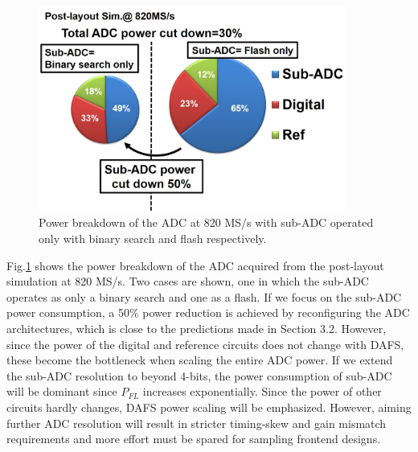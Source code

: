 \begin{figure}
\centering
  \includegraphics[width=0.9\textwidth]{figure/chap3/fig20.jpg}
  \caption{Power breakdown of the ADC at 820 MS/s with sub-ADC operated
only with binary search and flash respectively.}
  \label{fig-3-20}
\end{figure}

Fig.\ref{fig-3-20} shows the power breakdown of the ADC acquired from the post-layout simulation at 820 MS/s. Two cases are shown, one in which the sub-ADC operates as only a binary search and one as a flash. If we focus on the sub-ADC power consumption, a 50\% power reduction is achieved by reconfiguring the ADC architectures, which is close to the predictions made in Section 3.2. However, since the power of the digital and reference circuits does not change with DAFS, these become the bottleneck when scaling the entire ADC power. If we extend the sub-ADC resolution to beyond 4-bits, the power consumption of sub-ADC will be dominant since \textit{$P_{FL}$} increases exponentially. Since the power of other circuits hardly changes, DAFS power scaling will be emphasized. However, aiming further ADC resolution will result in stricter timing-skew and gain mismatch requirements and more effort must be spared for sampling frontend designs.

